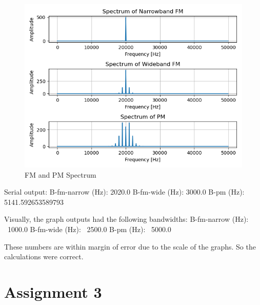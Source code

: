 \documentclass[
	letterpaper, %
	10pt, %
]{CSUniSchoolLabReport}
\begin{document}
\begin{figure}[H] %
	\centering %
	\includegraphics[width=1.2\textwidth]{assignment2.png} %
	\caption{FM and PM Spectrum}
	\label{fig:block}
\end{figure}

Serial output: 					\newline
B-fm-narrow (Hz):  2020.0 		\newline
B-fm-wide (Hz):  3000.0			\newline
B-pm (Hz):  5141.592653589793	\newline

Visually, the graph outputs had the following bandwidths:	\newline
B-fm-narrow (Hz):  ~1000.0		\newline
B-fm-wide (Hz):  ~2500.0		\newline
B-pm (Hz):  ~5000.0				\newline

These numbers are within margin of error due to the scale of the graphs. So the calculations were correct.

\section{Assignment 3}
\end{document}
